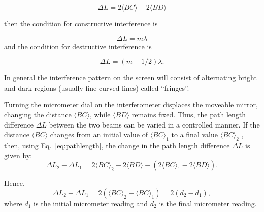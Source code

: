 \begin{equation}
\Delta L = 2\langle BC\rangle - 2\langle BD\rangle 
\label{eq:pathlength}
\end{equation}

then the condition for constructive interference is 

\begin{equation}
 \Delta L = m\lambda
\label{eq:constructive}
\end{equation}
and the condition for destructive interference is

\begin{equation}
\Delta L = (m+1/2)\lambda.
\label{eq:destructive}
\end{equation}

In general the interference pattern on the screen will consist of alternating
bright and dark regions (usually fine curved lines) called
``fringes''.

Turning the micrometer dial on the interferometer displaces the moveable mirror,
changing the distance $\langle BC \rangle$, while $\langle BD\rangle $ remains
fixed. Thus, the path length difference $\Delta L$ between the two beams can be varied
in a controlled manner. If the distance $\langle BC\rangle$ changes from an
initial value of $\langle BC\rangle_{1}$ to a final value $\langle
BC\rangle_{2}$ , then, using Eq.~\ref{eq:pathlength}, the change in the path
length difference $\Delta L$ is given by:
\begin{equation}
 \Delta L_2 - \Delta L_{1} = 2\langle BC\rangle_{2} - 2\langle BD\rangle - (2\langle
 BC\rangle_{1} - 2\langle BD\rangle).
\label{eq:deltapathlength}
\end{equation}

\noindent Hence,
\begin{equation}
\Delta L_{2} - \Delta L_{1} = 2(\langle BC\rangle_{2}  - \langle BC\rangle_{1}) = 2(d_{2} -
d_{1}),
\end{equation}
\noindent where $d_{1}$ is the initial micrometer reading and $d_{2}$ is the
final micrometer reading. 

